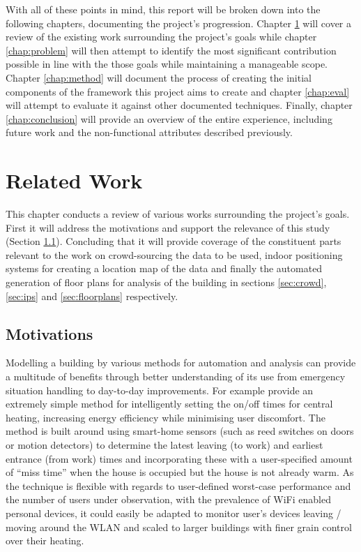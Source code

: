 \documentclass{UoYCSproject}
\begin{document}
        With all of these points in mind, this report will be broken down into the following chapters, documenting the project's progression. Chapter \ref{chap:related} will cover a review of the existing work surrounding the project's goals while chapter \ref{chap:problem} will then attempt to identify the most significant contribution possible in line with the those goals while maintaining a manageable scope. Chapter \ref{chap:method} will document the process of creating the initial components of the framework this project aims to create and chapter \ref{chap:eval} will attempt to evaluate it against other documented techniques. Finally, chapter \ref{chap:conclusion} will provide an overview of the entire experience, including future work and the non-functional attributes described previously.
        
	\chapter{Related Work}
    \label{chap:related}
	
		This chapter conducts a review of various works surrounding the project's goals. First it will address the motivations and support the relevance of this study (Section \ref{sec:motivations}). Concluding that it will provide coverage of the constituent parts relevant to the work on crowd-sourcing the data to be used, indoor positioning systems for creating a location map of the data and finally the automated generation of floor plans for analysis of the building in sections \ref{sec:crowd}, \ref{sec:ips} and \ref{sec:floorplans} respectively.
        
        \section{Motivations}
        \label{sec:motivations}
        
            Modelling a building by various methods for automation and analysis can provide a multitude of benefits through better understanding of its use from emergency situation handling to day-to-day improvements. For example \citet{gao2009self} provide an extremely simple method for intelligently setting the on/off times for central heating, increasing energy efficiency while minimising user discomfort. The method is built around using smart-home sensors (such as reed switches on doors or motion detectors) to determine the latest leaving (to work) and earliest entrance (from work) times and incorporating these with a user-specified amount of ``miss time'' when the house is occupied but the house is not already warm. As the technique is flexible with regards to user-defined worst-case performance and the number of users under observation, with the prevalence of WiFi enabled personal devices, it could easily be adapted to monitor user's devices leaving / moving around the WLAN and scaled to larger buildings with finer grain control over their heating.
            
\end{document}
